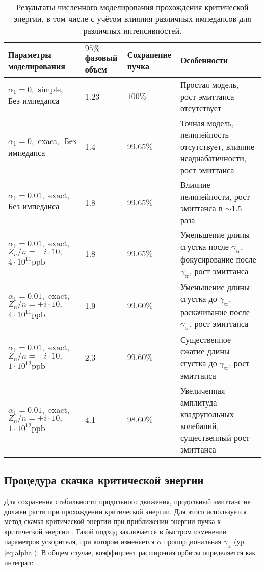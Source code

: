 \begin{table}
\begin{center}
\begin{tabular}{| m{4cm} | M{2.5cm} | M{2.5cm} | m{6.6cm} |}
\hline 
Параметры моделирования & $95 \%$ фазовый объем & Сохранение пучка & Особенности \\
\hline
$\alpha_1=0, \text { simple, }$ Без импеданса & 1.23 & $100\%$ & Простая модель, рост эмиттанса отсутствует \\
\hline 
$\alpha_1=0, \text { exact, }$ Без импеданса & 1.4 & $99.65\%$ & Точная модель, нелинейность отсутствует, влияние неадиабатичности, рост эмиттанса \\
\hline 
$\alpha_1=0.01, \text { exact, }$ Без импеданса & 1.8 & $99.65\%$ & Влияние нелинейности, рост эмиттанса в $\sim 1.5$ раза \\
\hline 
$
 \alpha_1=0.01, \text { exact, }$
$ Z_n / n=-i \cdot 10, \quad$
$4 \cdot 10^{11} \mathrm{ppb} $
 & 1.8 & $99.65\%$ & Уменьшение длины сгустка после $\gamma_{\mathrm{tr}}$, фокусирование после $\gamma_{\mathrm{tr}}$, рост эмиттанса \\
\hline 
$
\alpha_1=0.01, \text { exact, }$ 
$ Z_n / n=+i \cdot 10, \quad$
$4 \cdot 10^{11} \mathrm{ppb} $
 & 1.9 & $99.60\%$ & Уменьшение длины сгустка до $\gamma_{\mathrm{tr}}$, раскачивание после $\gamma_{\mathrm{tr}}$, рост эмиттанса \\
\hline 
$
\alpha_1=0.01, \text { exact, } $ 
$Z_n / n=-i \cdot 10, \quad$
$1 \cdot 10^{12} \mathrm{ppb}$
 & 2.3 & $99.60\%$ & Существенное сжатие длины сгустка до $\gamma_{\mathrm{tr}}$, рост эмиттанса \\
\hline 
$
 \alpha_1=0.01, \text { exact, } $ 
$ Z_n / n=+i \cdot 10, \quad$
$ 1 \cdot 10^{12} \mathrm{ppb}$
 & 4.1 & $98.60\%$ & Увеличенная амплитуда квадрупольных колебаний, существенный рост эмиттанса \\
\hline
\end{tabular}
\end{center}
\caption{Результаты численного моделирования прохождения критической энергии, в том числе с учётом влияния различных импедансов для различных интенсивностей.}
\label{tbl:u-70_crossing}
\end{table}


\newpage
\subsection{Процедура скачка критической энергии}

\par Для сохранения стабильности продольного движения, продольный эмиттанс не должен расти при прохождении критической энергии. Для этого используется метод скачка критической энергии при приближении энергии пучка к критической энергии \cite{risselada:jump}. Такой подход заключается в быстром изменении параметров ускорителя, при котором изменяется $\alpha$ пропорциональная $\gamma_{\textrm{tr}}$ (ур. \ref{eq:alpha}). В общем случае, коэффициент расширения орбиты определяется как интеграл:


